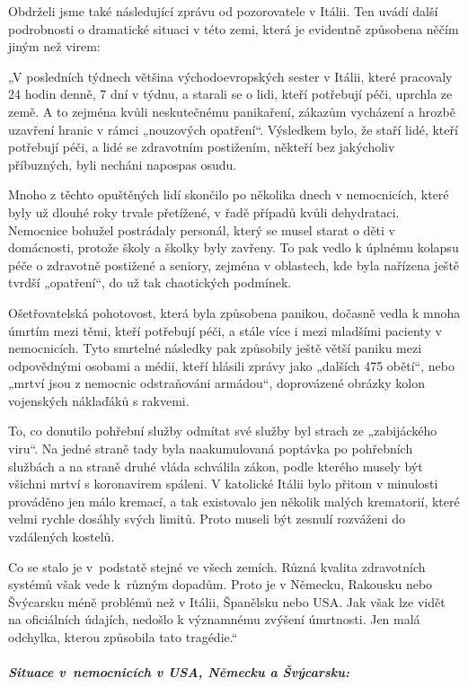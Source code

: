 Obdrželi jsme také následující zprávu od pozorovatele v Itálii. Ten
uvádí další podrobnosti o dramatické situaci v této zemi, která je
evidentně způsobena něčím jiným než virem:

„V posledních týdnech většina východoevropských sester v Itálii, které
pracovaly 24 hodin denně, 7 dní v týdnu, a starali se o lidi, kteří
potřebují péči, uprchla ze země. A to zejména kvůli neskutečnému
panikaření, zákazům vycházení a hrozbě uzavření hranic v rámci
„nouzových opatření``. Výsledkem bylo, že staří lidé, kteří potřebují
péči, a lidé se zdravotním postižením, někteří bez jakýcholiv
příbuzných, byli necháni napospas osudu.

Mnoho z těchto opuštěných lidí skončilo po několika dnech v nemocnicích,
které byly už dlouhé roky trvale přetížené, v řadě případů kvůli
dehydrataci. Nemocnice bohužel postrádaly personál, který se musel
starat o děti v domácnosti, protože školy a školky byly zavřeny. To pak
vedlo k úplnému kolapsu péče o zdravotně postižené a seniory, zejména v
oblastech, kde byla nařízena ještě tvrdší „opatření``, do už tak
chaotických podmínek.

Ošetřovatelská pohotovost, která byla způsobena panikou, dočasně vedla k
mnoha úmrtím mezi těmi, kteří potřebují péči, a stále více i mezi
mladšími pacienty v nemocnicích. Tyto smrtelné následky pak způsobily
ještě větší paniku mezi odpovědnými osobami a médii, kteří hlásili
zprávy jako „dalších 475 obětí``, nebo „mrtví jsou z nemocnic
odstraňováni armádou``, doprovázené obrázky kolon vojenských náklaďáků s
rakvemi.

To, co donutilo pohřební služby odmítat své služby byl strach ze
„zabijáckého viru``. Na jedné straně tady byla naakumulovaná poptávka po
pohřebních službách a na straně druhé vláda schválila zákon, podle
kterého musely být všichni mrtví s koronavirem spáleni. V katolické
Itálii bylo přitom v minulosti prováděno jen málo kremací, a tak
existovalo jen několik malých krematorií, které velmi rychle dosáhly
svých limitů. Proto museli být zesnulí rozváženi do vzdálených kostelů.

Co se stalo je v~podstatě stejné ve všech zemích. Různá kvalita
zdravotních systémů však vede k~různým dopadům. Proto je v Německu,
Rakousku nebo Švýcarsku méně problémů než v Itálii, Španělsku nebo USA.
Jak však lze vidět na oficiálních údajích, nedošlo k významnému zvýšení
úmrtnosti. Jen malá odchylka, kterou způsobila tato tragédie.``

\hypertarget{situace-v-nemocnicuxedch-v-usa-nux11bmecku-a-ux161vuxfdcarsku}{%
\subparagraph{\texorpdfstring{\textbf{Situace v~nemocnicích v USA,
Německu a
Švýcarsku:}}{Situace v~nemocnicích v USA, Německu a Švýcarsku:}}\label{situace-v-nemocnicuxedch-v-usa-nux11bmecku-a-ux161vuxfdcarsku}}

